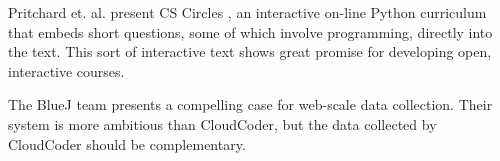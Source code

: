 \documentclass{sig-alternate}
\begin{document}
Pritchard et. al. present CS Circles
\cite{Pritchard:2013:CCI:2445196.2445370}, an interactive on-line
Python curriculum that embeds short questions, some of which involve
programming, directly into the text.  This sort of interactive text
shows great promise for developing open, interactive courses.

The BlueJ team presents a compelling case for web-scale data
collection\cite{Utting:2012:WDG:2361276.2361278}.  Their system is
more ambitious than CloudCoder, but the data collected by CloudCoder
should be complementary.

%
%
%
%
\end{document}
